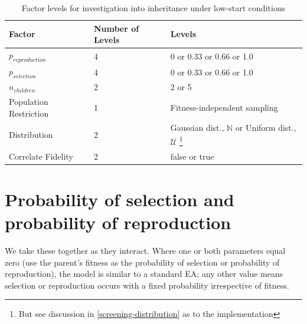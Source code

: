 \begin{table}
	\begin{center}
		\caption{Factor levels for investigation into inheritance under low-start conditions}\label{tbl:factor-levels-for-investigation-into-inheritance-under-low-start-conditions}
		\begin{tabular}{@{}llp{6cm}@{}}
			\toprule
			Factor                 & Number of Levels & Levels                                                                                                                                              \\
			\midrule
			$p_{reproduction}$     & 4                & 0 or 0.33 or 0.66 or 1.0                                                                                                                            \\
			$p_{selection}$        & 4                & 0 or 0.33 or 0.66 or 1.0                                                                                                                            \\
			$n_{children}$         & 2                & 2 or 5                                                                                                                                              \\
			Population Restriction & 1                & Fitness-independent sampling                                                                                                                        \\
			Distribution           & 2                & Gaussian dist., $\mathbb{N}$ or Uniform dist., $\mathcal{U}$ \footnote{But see discussion in \ref{screening-distribution} as to the implementation} \\
			Correlate Fidelity     & 2                & false or true                                                                                                                                       \\
			\bottomrule
		\end{tabular}
	\end{center}
\end{table}

\section{Probability of selection and probability of reproduction}

We take these together as they interact. Where one or both parameters equal zero (use the parent's fitness as the probability of selection or probability of reproduction), the model is similar to a standard EA; any other value means selection or reproduction occurs with a fixed probability irrespective of fitness.

